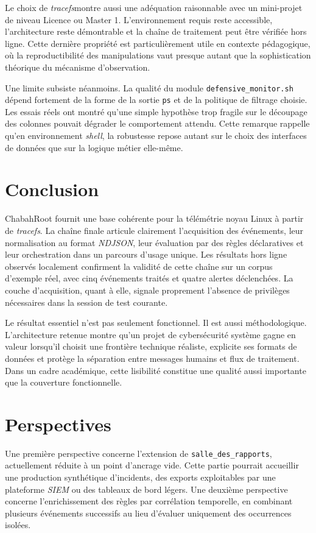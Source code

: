 \documentclass[12pt,a4paper]{report}
\newcommand{\tracefs}{\textit{tracefs}}
\newcommand{\ndjson}{\textit{NDJSON}}
\newcommand{\shellterm}{\textit{shell}}
\begin{document}
Le choix de \tracefs montre aussi une adéquation raisonnable avec un mini-projet de niveau Licence ou Master 1. L’environnement requis reste accessible, l’architecture reste démontrable et la chaîne de traitement peut être vérifiée hors ligne. Cette dernière propriété est particulièrement utile en contexte pédagogique, où la reproductibilité des manipulations vaut presque autant que la sophistication théorique du mécanisme d’observation.

Une limite subsiste néanmoins. La qualité du module \texttt{defensive\_monitor.sh} dépend fortement de la forme de la sortie \texttt{ps} et de la politique de filtrage choisie. Les essais réels ont montré qu’une simple hypothèse trop fragile sur le découpage des colonnes pouvait dégrader le comportement attendu. Cette remarque rappelle qu’en environnement \shellterm, la robustesse repose autant sur le choix des interfaces de données que sur la logique métier elle-même.

\chapter{Conclusion}
ChabahRoot fournit une base cohérente pour la télémétrie noyau Linux à partir de \tracefs. La chaîne finale articule clairement l’acquisition des événements, leur normalisation au format \ndjson, leur évaluation par des règles déclaratives et leur orchestration dans un parcours d’usage unique. Les résultats hors ligne observés localement confirment la validité de cette chaîne sur un corpus d’exemple réel, avec cinq événements traités et quatre alertes déclenchées. La couche d’acquisition, quant à elle, signale proprement l’absence de privilèges nécessaires dans la session de test courante.

Le résultat essentiel n’est pas seulement fonctionnel. Il est aussi méthodologique. L’architecture retenue montre qu’un projet de cybersécurité système gagne en valeur lorsqu’il choisit une frontière technique réaliste, explicite ses formats de données et protège la séparation entre messages humains et flux de traitement. Dans un cadre académique, cette lisibilité constitue une qualité aussi importante que la couverture fonctionnelle.

\chapter{Perspectives}
Une première perspective concerne l’extension de \texttt{salle\_des\_rapports}, actuellement réduite à un point d’ancrage vide. Cette partie pourrait accueillir une production synthétique d’incidents, des exports exploitables par une plateforme \textit{SIEM} ou des tableaux de bord légers. Une deuxième perspective concerne l’enrichissement des règles par corrélation temporelle, en combinant plusieurs événements successifs au lieu d’évaluer uniquement des occurrences isolées.
\end{document}
